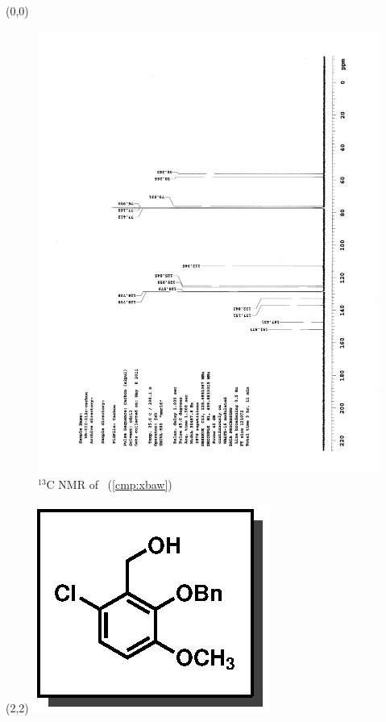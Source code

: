 \clearpage
\begin{textblock}{20}(0,0)
\begin{figure}[htb]
\caption{$^{13}$C NMR of  \CMPxbaw\ (\ref{cmp:xbaw})}
\includegraphics[scale=0.75, trim = 0mm 0mm 0mm 5mm,
clip]{chp_singlecarbon/images/nmr/xbawC}
\vspace{-100pt}
\end{figure}
\end{textblock}
\begin{textblock}{1}(2,2)
\includegraphics[scale=0.8, angle=90]{chp_singlecarbon/images/xbaw}
\end{textblock}
\clearpage

